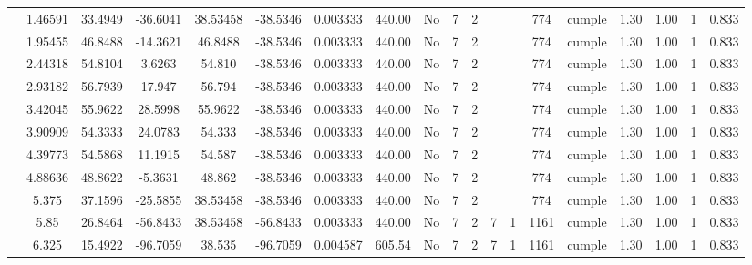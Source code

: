 \begin{table}[H]
{\begin{tabular}{|c|c|c|c|c|c|r|c|c|c|c|c|c|c|c|c|c|c|c|}
\cline{2-19}    & 1.46591 & 33.4949 & -36.6041 & 38.53458 & -38.5346 & 0.003333 & 440.00 & No  & 7   & 2   &     &     & 774 & \cellcolor[rgb]{ .776,  .937,  .808}cumple & 1.30 & 1.00 & 1   & 0.833 \bigstrut\\
\cline{2-19}    & 1.95455 & 46.8488 & -14.3621 & 46.8488 & -38.5346 & 0.003333 & 440.00 & No  & 7   & 2   &     &     & 774 & \cellcolor[rgb]{ .776,  .937,  .808}cumple & 1.30 & 1.00 & 1   & 0.833 \bigstrut\\
\cline{2-19}    & 2.44318 & 54.8104 & 3.6263 & 54.810 & -38.5346 & 0.003333 & 440.00 & No  & 7   & 2   &     &     & 774 & \cellcolor[rgb]{ .776,  .937,  .808}cumple & 1.30 & 1.00 & 1   & 0.833 \bigstrut\\
\cline{2-19}    & 2.93182 & 56.7939 & 17.947 & 56.794 & -38.5346 & 0.003333 & 440.00 & No  & 7   & 2   &     &     & 774 & \cellcolor[rgb]{ .776,  .937,  .808}cumple & 1.30 & 1.00 & 1   & 0.833 \bigstrut\\
\cline{2-19}    & 3.42045 & 55.9622 & 28.5998 & 55.9622 & -38.5346 & 0.003333 & 440.00 & No  & 7   & 2   &     &     & 774 & \cellcolor[rgb]{ .776,  .937,  .808}cumple & 1.30 & 1.00 & 1   & 0.833 \bigstrut\\
\cline{2-19}    & 3.90909 & 54.3333 & 24.0783 & 54.333 & -38.5346 & 0.003333 & 440.00 & No  & 7   & 2   &     &     & 774 & \cellcolor[rgb]{ .776,  .937,  .808}cumple & 1.30 & 1.00 & 1   & 0.833 \bigstrut\\
\cline{2-19}    & 4.39773 & 54.5868 & 11.1915 & 54.587 & -38.5346 & 0.003333 & 440.00 & No  & 7   & 2   &     &     & 774 & \cellcolor[rgb]{ .776,  .937,  .808}cumple & 1.30 & 1.00 & 1   & 0.833 \bigstrut\\
\cline{2-19}    & 4.88636 & 48.8622 & -5.3631 & 48.862 & -38.5346 & 0.003333 & 440.00 & No  & 7   & 2   &     &     & 774 & \cellcolor[rgb]{ .776,  .937,  .808}cumple & 1.30 & 1.00 & 1   & 0.833 \bigstrut\\
\cline{2-19}    & 5.375 & 37.1596 & -25.5855 & 38.53458 & -38.5346 & 0.003333 & 440.00 & No  & 7   & 2   &     &     & 774 & \cellcolor[rgb]{ .776,  .937,  .808}cumple & 1.30 & 1.00 & 1   & 0.833 \bigstrut\\
\cline{2-19}    & 5.85 & 26.8464 & -56.8433 & 38.53458 & -56.8433 & 0.003333 & 440.00 & No  & 7   & 2   & 7   & 1   & 1161 & \cellcolor[rgb]{ .776,  .937,  .808}cumple & 1.30 & 1.00 & 1   & 0.833 \bigstrut\\
\cline{2-19}    & 6.325 & 15.4922 & -96.7059 & 38.535 & -96.7059 & 0.004587 & 605.54 & No  & 7   & 2   & 7   & 1   & 1161 & \cellcolor[rgb]{ .776,  .937,  .808}cumple & 1.30 & 1.00 & 1   & 0.833 \bigstrut\\

\end{tabular}}
\end{table}
